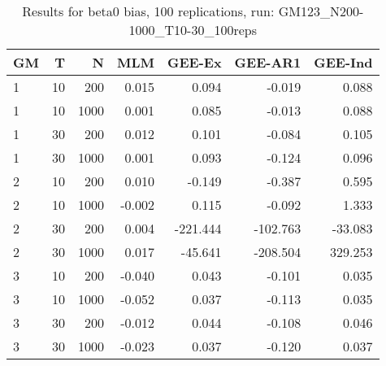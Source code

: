 \begin{table}[ht]
\centering
\begin{tabular}{lrrrrrr}
  \hline
GM & T & N & MLM & GEE-Ex & GEE-AR1 & GEE-Ind \\ 
  \hline
1 & 10 & 200 & 0.015 & 0.094 & -0.019 & 0.088 \\ 
  1 & 10 & 1000 & 0.001 & 0.085 & -0.013 & 0.088 \\ 
  1 & 30 & 200 & 0.012 & 0.101 & -0.084 & 0.105 \\ 
  1 & 30 & 1000 & 0.001 & 0.093 & -0.124 & 0.096 \\ 
  2 & 10 & 200 & 0.010 & -0.149 & -0.387 & 0.595 \\ 
  2 & 10 & 1000 & -0.002 & 0.115 & -0.092 & 1.333 \\ 
   \hline
2 & 30 & 200 & 0.004 & -221.444 & -102.763 & -33.083 \\ 
  2 & 30 & 1000 & 0.017 & -45.641 & -208.504 & 329.253 \\ 
  3 & 10 & 200 & -0.040 & 0.043 & -0.101 & 0.035 \\ 
  3 & 10 & 1000 & -0.052 & 0.037 & -0.113 & 0.035 \\ 
  3 & 30 & 200 & -0.012 & 0.044 & -0.108 & 0.046 \\ 
  3 & 30 & 1000 & -0.023 & 0.037 & -0.120 & 0.037 \\ 
   \hline
\end{tabular}
\caption{Results for beta0 bias, 100 replications, run: GM123_N200-1000_T10-30_100reps} 
\label{tab:beta0_bias}
\end{table}
